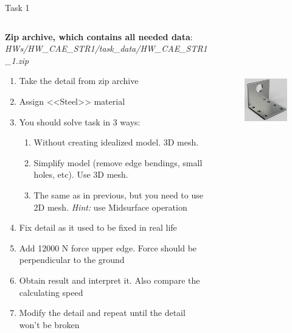 \documentclass[aspectratio=169]{beamer}
\begin{document}
\begin{frame}[t]{Task 1}
    \vspace{-0.4cm}
    \begin{columns}[T,onlytextwidth]
        \begin{column}{0.59\textwidth}
            \scriptsize
            \textbf{Zip archive, which contains all needed data}: \textit{HWs/HW\_CAE\_STR1/task\_data/HW\_CAE\_STR1\_1.zip}
            \begin{enumerate}
                \item Take the detail from zip archive
                \item Assign <<Steel>> material
                \item You should solve task in 3 ways:
                \begin{enumerate}
                    \scriptsize
                    \item Without creating idealized model. 3D mesh.
                    \item Simplify model (remove edge bendings, small holes, etc). Use 3D mesh.
                    \item The same as in previous, but you need to use 2D mesh. \textit{Hint:} use Midsurface operation 
                \end{enumerate}
                \item Fix detail as it used to be fixed in real life
                \item Add 12000 N force  upper edge. Force should be perpendicular to the ground
                \item Obtain result and interpret it. Also compare the calculating speed
                \item Modify the detail and repeat until the detail won't be broken
            \end{enumerate}
        \end{column}
        \begin{column}{0.39\textwidth}
            \begin{figure}[H]
                \centering\includegraphics[height=6cm,width=1\textwidth,keepaspectratio]{HW_CAE_STR1_1.png}
                \label{fig:HW_CAE_STR1_1.png}
            \end{figure}
        \end{column}
    \end{columns}
\end{frame}
\end{document}
